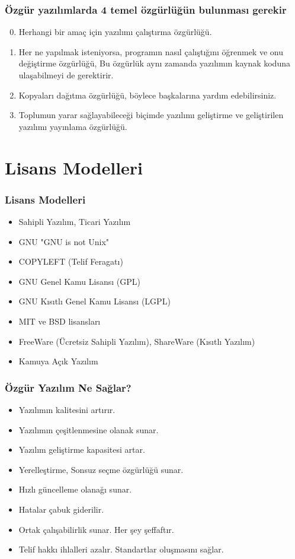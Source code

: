 \documentclass[english,svgnames,notes=hide,12pt]{beamer}
\begin{document}
\begin{frame}
\frametitle{Özgür yazılımlarda 4 temel özgürlüğün bulunması gerekir}

\begin{enumerate}[<+->]
\setcounter{enumi}{-1}
\item Herhangi bir amaç için yazılımı çalıştırma özgürlüğü.
\item Her ne yapılmak isteniyorsa, programın nasıl çalıştığını öğrenmek ve onu değiştirme özgürlüğü, Bu özgürlük aynı zamanda yazılımın kaynak koduna ulaşabilmeyi de gerektirir.
\item Kopyaları dağıtma özgürlüğü, böylece başkalarına yardım edebilirsiniz.
\item Toplumun yarar sağlayabileceği biçimde yazılımı geliştirme ve geliştirilen yazılımı yayınlama özgürlüğü.
\end{enumerate}
\end{frame}

\section{Lisans Modelleri}
\begin{frame}
\frametitle{Lisans Modelleri}
\begin{itemize}[<+->]
    \item Sahipli Yazılım, Ticari Yazılım
    \item GNU "GNU is not Unix"
    \item COPYLEFT (Telif Feragatı)
   \item GNU Genel Kamu Lisansı (GPL)
   \item GNU Kısıtlı Genel Kamu Lisansı (LGPL)
   \item MIT ve BSD lisansları
\item FreeWare (Ücretsiz Sahipli Yazılım), ShareWare (Kısıtlı Yazılım)
\item Kamuya Açık Yazılım
\end{itemize}
\end{frame}



\begin{frame}
\frametitle{Özgür Yazılım Ne Sağlar?}
\begin{itemize}[<+->]
    \item Yazılımın kalitesini artırır.
    \item Yazılımın çeşitlenmesine olanak sunar.
  \item Yazılım geliştirme kapasitesi artar.
    \item Yerelleştirme, Sonsuz seçme özgürlüğü sunar.
   \item Hızlı güncelleme olanağı sunar.
   \item Hatalar çabuk giderilir.
   \item Ortak çalışabilirlik sunar. Her şey şeffaftır.
 \item Telif hakkı ihlalleri azalır. Standartlar oluşmasını sağlar. 
\end{itemize}
\end{frame}
\end{document}

